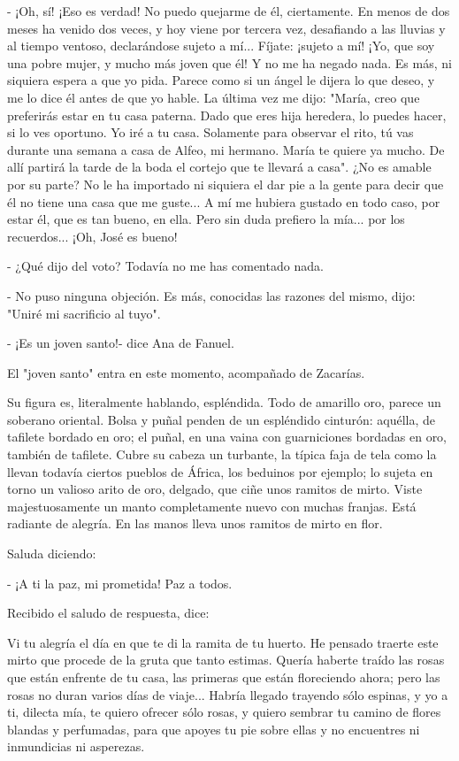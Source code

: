 \documentclass[12pt, twoside, openright]{book} %
\begin{document}
- ¡Oh, sí! ¡Eso es verdad! No puedo quejarme de él, ciertamente. En menos de dos meses ha venido dos veces, y hoy viene por tercera vez, desafiando a las lluvias y al tiempo ventoso, declarándose sujeto a mí... Fíjate: ¡sujeto a mí! ¡Yo, que soy una pobre mujer, y mucho más joven que él! Y no me ha negado nada. Es más, ni siquiera espera a que yo pida. Parece como si un ángel le dijera lo que deseo, y me lo dice él antes de que yo hable. La última vez me dijo: "María, creo que preferirás estar en tu casa paterna. Dado que eres hija heredera, lo puedes hacer, si lo ves oportuno. Yo iré a tu casa. Solamente para observar el rito, tú vas durante una semana a casa de Alfeo, mi hermano. María te quiere ya mucho. De allí partirá la tarde de la boda el cortejo que te llevará a casa". ¿No es amable por su parte? No le ha importado ni siquiera el dar pie a la gente para decir que él no tiene una casa que me guste... A mí me hubiera gustado en todo caso, por estar él, que es tan bueno, en ella. Pero sin duda prefiero la mía... por los recuerdos... ¡Oh, José es bueno! 

- ¿Qué dijo del voto? Todavía no me has comentado nada. 

- No puso ninguna objeción. Es más, conocidas las razones del mismo, dijo: "Uniré mi sacrificio al tuyo". 

- ¡Es un joven santo!- dice Ana de Fanuel. 

El "joven santo" entra en este momento, acompañado de Zacarías. 

Su figura es, literalmente hablando, espléndida. Todo de amarillo oro, parece un soberano oriental. Bolsa y puñal penden de un espléndido cinturón: aquélla, de tafilete bordado en oro; el puñal, en una vaina con guarniciones bordadas en oro, también de tafilete. Cubre su cabeza un turbante, la típica faja de tela como la llevan todavía ciertos pueblos de África, los beduinos por ejemplo; lo sujeta en torno un valioso arito de oro, delgado, que ciñe unos ramitos de mirto. Viste majestuosamente un manto completamente nuevo con muchas franjas. Está radiante de alegría. En las manos lleva unos ramitos de mirto en flor. 

Saluda diciendo: 

- ¡A ti la paz, mi prometida! Paz a todos. 

Recibido el saludo de respuesta, dice: 

Vi tu alegría el día en que te di la ramita de tu huerto. He pensado traerte este mirto que procede de la gruta que tanto estimas. Quería haberte traído las rosas que están enfrente de tu casa, las primeras que están floreciendo ahora; pero las rosas no duran varios días de viaje... Habría llegado trayendo sólo espinas, y yo a ti, dilecta mía, te quiero ofrecer sólo rosas, y quiero sembrar tu camino de flores blandas y perfumadas, para que apoyes tu pie sobre ellas y no encuentres ni inmundicias ni asperezas. 
\end{document}
